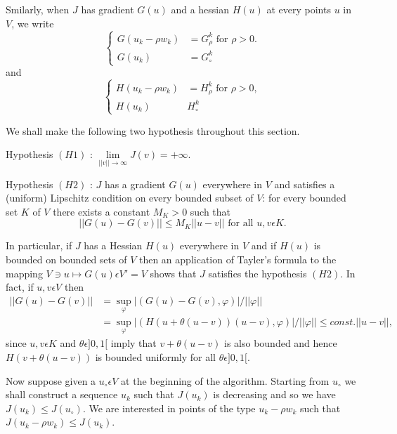 Smilarly, when $J$ has gradient $G(u)$ and a hessian $H(u)$ at every points $u$ in $V$, we write
\begin{equation*}
\begin{cases}
 G(u_{k} - \rho w_{k}) & = G_{\rho}^{k} \text{ for } \rho > 0.\\
 G(u_{k}) & = G_{\circ}^{k}
\end{cases}
\end{equation*}
and\pageoriginale
\begin{equation*}
\begin{cases}
H(u_{k} - \rho w_{k}) & = H_{\rho}^{k} \text{ for } \rho > 0,\\
H(u_{k}) & H_{\circ}^{k}
\end{cases}
\end{equation*}

We shall make the following two hypothesis throughout this section.

Hypothesis $(H1)$ : $\lim\limits_{||v|| \to \infty} J(v) = +\infty$.

Hypothesis $(H2)$ : $J$ has a gradient $G(u)$ everywhere in $V$ and satisfies a (uniform) Lipschitz condition on every bounded subset of $V$: for every bounded set $K$ of $V$ there exists a constant $M_{K} > 0$ such that
$$
||G(u) - G(v)|| \leq M_{K} ||u-v|| \text{ for all } u, v \epsilon K.
$$

In particular, if $J$ has a Hessian $H(u)$ everywhere in $V$ and if $H(u)$ is bounded on bounded sets of $V$ then an application of Tayler's formula to the mapping $V \ni u \mapsto G(u) \epsilon V' = V$ shows that $J$ satisfies the hypothesis $(H2)$. In fact, if $u, v \epsilon V$ then 
\begin{align*}
||G(u) - G(v)|| &= \sup_{\varphi} |(G(u) - G(v), \varphi)| /
||\varphi||\\
& = \sup_{\varphi} |(H(u+\theta(u-v))(u-v), \varphi)| / ||\varphi|| \leq const. ||u-v||, 
\end{align*}
since $u, v \epsilon K$ and $\theta \epsilon ]0, 1[$ imply that $v+\theta(u-v)$ is also bounded and hence $H(v+\theta(u-v))$ is bounded uniformly for all $\theta \epsilon ]0,1[$.

Now suppose given a $u_{\circ} \epsilon V$ at the beginning of the algorithm. Starting from $u_{\circ}$ we shall construct a sequence $u_{k}$ such that $J(u_{k})$ is decreasing and so we have $J(u_{k}) \leq J(u_{\circ})$. We are interested in points of the type $u_{k} - \rho w_{k}$ such that $J(u_{k} - \rho w_{k}) \leq J(u_{k})$.

